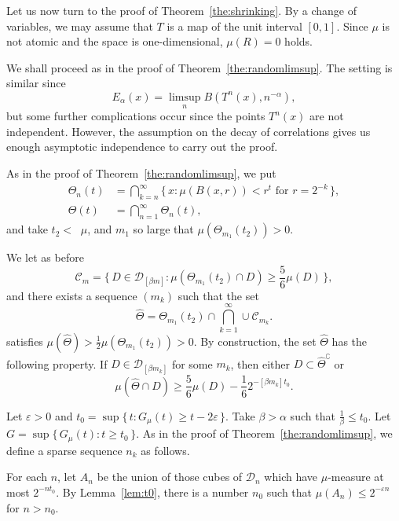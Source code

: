 \documentclass[10pt]{amsart}
\theoremstyle{definition}\newtheorem{defi}[theo]{Definition}\newtheorem{rema}[theo]{Remark}\newtheorem{exam}[theo]{Example}\newtheorem{exem}[theo]{Example}\newtheorem{nota}[theo]{Notation}
\DeclareMathOperator{\udimh}{\overline{dim}_H}
\begin{document}
Let us now turn to the proof of Theorem~\ref{the:shrinking}. By a change of variables, we may assume that $T$ is a map of the unit interval $[0,1]$. Since $\mu$ is not atomic and the space is one-dimensional, $\mu (R) = 0$ holds.

We shall proceed as in the proof of Theorem~\ref{the:randomlimsup}. The setting is similar since
\[
E_\alpha (x) = \limsup_n B(T^n (x), n^{-\alpha}),
\]
but some further complications occur since the points $T^n (x)$ are not independent. However, the assumption on the decay of correlations gives us enough asymptotic independence to carry out the proof.

As in the proof of Theorem~\ref{the:randomlimsup}, we put
\begin{align*}
\Theta_n (t) &= \bigcap_{k=n}^\infty \{\, x : \mu (B(x,r)) < r^t
\text{ for } r = 2^{- k} \,\}, \\ \Theta (t) &= \bigcap_{n=1}^\infty
\Theta_n (t),
\end{align*}
and take $t_2 < \udimh \mu$, and $m_1$ so large that $\mu (\Theta_{m_1} (t_2)) > 0$.

We let as before
\[
\mathscr{C}_m = \{\, D \in \mathscr{D}_{[\beta m]} : \mu (\Theta_{m_1} (t_2) \cap D) \geq \frac{5}{6} \mu (D) \,\},
\]
and there exists a sequence $(m_k)$ such that the set
\[
\hat{\Theta} = \Theta_{m_1} (t_2) \cap \bigcap_{k=1}^\infty \cup
\mathscr{C}_{m_k}.
\]
satisfies $\mu (\hat{\Theta}) > \frac{1}{2} \mu (\Theta_{m_1} (t_2)) > 0$. By construction, the set $\hat{\Theta}$ has the following property. If $D \in \mathscr{D}_{[\beta m_k]}$ for some $m_k$, then either $D \subset \hat{\Theta}^\complement$ or
\begin{equation}\label{eq:propertyofDelta2}
\mu (\hat{\Theta} \cap D) \geq \frac{5}{6} \mu (D) - \frac{1}{6} 2^{-[\beta m_k]t_0}.
\end{equation}

Let $\varepsilon > 0$ and $t_0 = \sup \{\, t: G_\mu (t) \geq t - 2
\varepsilon \,\}$. Take $\beta > \alpha$ such that $\frac{1}{\beta}
\leq t_0$. Let $G = \sup \{\, G_\mu (t) : t \geq t_0 \,\}$. As in the proof of Theorem~\ref{the:randomlimsup}, we define a sparse sequence $n_k$ as follows.

For each $n$, let $A_n$ be the union of those cubes of $\mathscr{D}_n$ which have $\mu$-measure at most $2^{-n t_0}$. By Lemma~\ref{lem:t0}, there is a number $n_0$ such that $\mu (A_n) \leq 2^{-\varepsilon n}$ for $n > n_0$.
\end{document}
